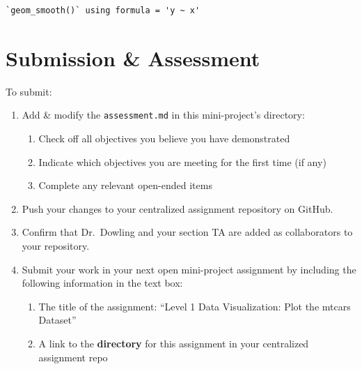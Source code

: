 \documentclass[
  man,
  floatsintext,
  longtable,
  nolmodern,
  notxfonts,
  notimes,
  colorlinks=true,linkcolor=blue,citecolor=blue,urlcolor=blue]{apa7}
\providecommand{\tightlist}{%
  \setlength{\itemsep}{0pt}\setlength{\parskip}{0pt}}
\begin{document}
\begin{verbatim}
`geom_smooth()` using formula = 'y ~ x'
\end{verbatim}

\section{Submission \& Assessment}\label{submission-assessment}

To submit:

\begin{enumerate}
\def\labelenumi{\arabic{enumi}.}
\tightlist
\item
  Add \& modify the \texttt{assessment.md} in this mini-project's
  directory:

  \begin{enumerate}
  \def\labelenumii{\arabic{enumii}.}
  \tightlist
  \item
    Check off all objectives you believe you have demonstrated
  \item
    Indicate which objectives you are meeting for the first time (if
    any)
  \item
    Complete any relevant open-ended items
  \end{enumerate}
\item
  Push your changes to your centralized assignment repository on GitHub.
\item
  Confirm that Dr.~Dowling and your section TA are added as
  collaborators to your repository.
\item
  Submit your work in your next open mini-project assignment by
  including the following information in the text box:

  \begin{enumerate}
  \def\labelenumii{\arabic{enumii}.}
  \tightlist
  \item
    The title of the assignment: ``Level 1 Data Visualization: Plot the
    mtcars Dataset''
  \item
    A link to the \textbf{directory} for this assignment in your
    centralized assignment repo
  \end{enumerate}
\end{enumerate}
\end{document}
